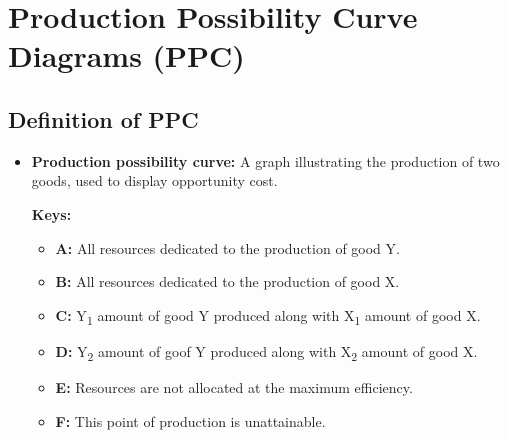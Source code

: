 \documentclass[11pt, a4paper, openany]{book}
\begin{document}
\section{Production Possibility Curve Diagrams (PPC)}

\subsection{Definition of PPC}

\begin{itemize}\itemsep0em
    \item \textbf{Production possibility curve:} A graph illustrating the production of two goods, used to display opportunity cost.

    \begin{minipage}{0.45\textwidth}
        \textbf{Keys:}
        \begin{itemize}\itemsep0em
            \item \textbf{A:} All resources dedicated to the production of good Y.
            \item \textbf{B:} All resources dedicated to the production of good X.
            \item \textbf{C:} Y\textsubscript{1} amount of good Y produced along with X\textsubscript{1} amount of good X.
            \item \textbf{D:} Y\textsubscript{2} amount of goof Y produced along with X\textsubscript{2} amount of good X.
            \item \textbf{E:} Resources are not allocated at the maximum efficiency.
            \item \textbf{F:} This point of production is unattainable.
        \end{itemize}
    \end{minipage}
    \begin{minipage}{0.3\textwidth}
\end{minipage}
\end{itemize}
\end{document}
